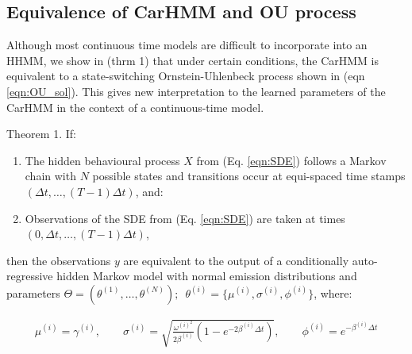 \subsection{Equivalence of CarHMM and OU process}

Although most continuous time models are difficult to incorporate into an HHMM, we show in (thrm 1) that under certain conditions, the CarHMM is equivalent to a state-switching Ornstein-Uhlenbeck process shown in (eqn \ref{eqn:OU_sol}). This gives new interpretation to the learned parameters of the CarHMM in the context of a continuous-time model.

\begin{theorem}{Theorem 1.}{}%
If:
\begin{enumerate}
    \item The hidden behavioural process $X$ from (Eq. \ref{eqn:SDE}) follows a Markov chain with $N$ possible states and transitions occur at equi-spaced time stamps $\left(\Delta t, \ldots, (T-1)\Delta t\right)$, and:
    \item Observations of the SDE from (Eq. \ref{eqn:SDE}) are taken at times $\left(0, \Delta t, \ldots, (T-1)\Delta t\right)$,
\end{enumerate}
then the observations $y$ are equivalent to the output of a conditionally auto-regressive hidden Markov model with normal emission distributions and parameters $\Theta = (\theta^{(1)}, \ldots, \theta^{(N)}); \enspace \theta^{(i)} = \{\mu^{(i)},\sigma^{(i)},\phi^{(i)}\}$, where:

\begin{align}
\mu^{(i)} = \gamma^{(i)}, \qquad \sigma^{(i)} = \sqrt{\frac{\omega^{(i)^2}}{2\beta^{(i)}} (1-e^{-2\beta^{(i)}\Delta t})}, \qquad \phi^{(i)} = e^{-\beta^{(i)}\Delta t} \label{eqn:CarHMM_to_OU}
\end{align}

\end{theorem}

